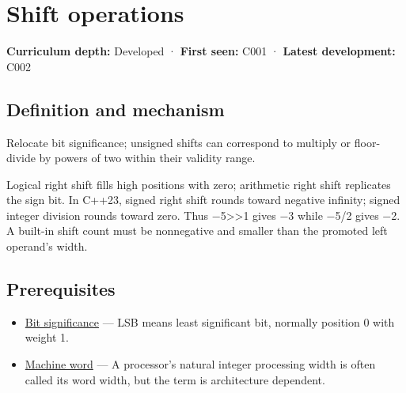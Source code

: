\hypertarget{appendix-73425b25118e}{}\label{referencestart:appendix-73425b25118e}
\section{Shift operations}\label{appendix-73425b25118e-shift-operations}

\hypertarget{appendix-73425b25118e-shift-operations}{}

\textbf{Curriculum depth:} Developed · \textbf{First seen:} C001 · \textbf{Latest development:} C002

\begin{allmightroledefinition}

\subsection{Definition and mechanism}\label{appendix-73425b25118e-definition-and-mechanism}

\hypertarget{appendix-73425b25118e-definition-and-mechanism}{}

Relocate bit significance; unsigned shifts can correspond to multiply or floor-divide by powers of two within their validity range.

\end{allmightroledefinition}

Logical right shift fills high positions with zero; arithmetic right shift replicates the sign bit. In C++23, signed right shift rounds toward negative infinity; signed integer division rounds toward zero. Thus −5\textgreater\textgreater1 gives −3 while −5/2 gives −2. A built-in shift count must be nonnegative and smaller than the promoted left operand's width.

\subsection{Prerequisites}\label{appendix-73425b25118e-prerequisites}

\hypertarget{appendix-73425b25118e-prerequisites}{}

\begin{itemize}
\tightlist
\item
  \hyperref[appendix-280445746493]{Bit significance} --- LSB means least significant bit, normally position 0 with weight 1.
\item
  \hyperref[appendix-d67a19507dc5]{Machine word} --- A processor's natural integer processing width is often called its word width, but the term is architecture dependent.
\end{itemize}

